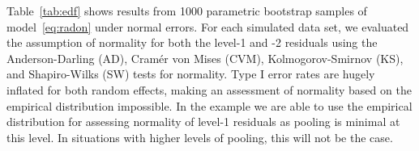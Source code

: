\documentclass[11pt]{article} %
\begin{document}
Table~\ref{tab:edf} shows results from 1000 parametric bootstrap samples of model~\ref{eq:radon} under normal errors.
For each simulated data set, we evaluated the assumption of normality for both the level-1 and -2 residuals using the Anderson-Darling (AD), Cram{\'e}r von Mises (CVM),  Kolmogorov-Smirnov (KS), and Shapiro-Wilks (SW) tests for normality.  
Type I error rates are hugely inflated for both random effects, making an assessment of normality based on the empirical distribution impossible.
In the example we are able to use  the empirical distribution for assessing normality of  level-1 residuals  as  pooling is minimal at this level. In situations with higher levels of pooling, this will not be the case.
\end{document}
